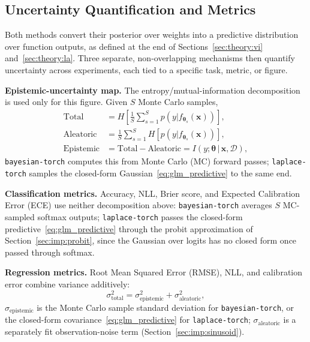 \documentclass[conference]{IEEEtran}
\newcommand{\btheta}{\bm{\theta}}
\newcommand{\cD}{\mathcal{D}}
\begin{document}
\subsection{Uncertainty Quantification and Metrics}
\label{sec:theory:unc_decomp}

Both methods convert their posterior over weights into a predictive distribution over
function outputs, as defined at the end of Sections~\ref{sec:theory:vi}
and~\ref{sec:theory:la}. Three separate, non-overlapping mechanisms then quantify
uncertainty across experiments, each tied to a specific task, metric, or figure.

\textbf{Epistemic-uncertainty map.} The entropy/mutual-information
decomposition~\citep{depeweg2019modeling} is used only for this figure. Given $S$ Monte Carlo
samples,
\begin{align}
	\text{Total}     & = H\!\left[\frac{1}{S}\sum_{s=1}^{S} p(y|f_{\btheta_s}(\bm{x}))\right], \\
	\text{Aleatoric} & = \frac{1}{S}\sum_{s=1}^{S} H\!\left[p(y|f_{\btheta_s}(\bm{x}))\right], \\
	\text{Epistemic} & = \text{Total} - \text{Aleatoric}
	= I\!\left(y;\btheta\,|\,\bm{x},\cD\right),
	\label{eq:mi}
\end{align}
\texttt{bayesian-torch} computes this from Monte Carlo (MC) forward passes;
\texttt{laplace-torch} samples
the closed-form Gaussian~\eqref{eq:glm_predictive} to the same end.

\textbf{Classification metrics.} Accuracy, NLL, Brier score, and Expected Calibration Error
(ECE) use neither decomposition above: \texttt{bayesian-torch} averages $S$ MC-sampled
softmax outputs;
\texttt{laplace-torch} passes the closed-form predictive~\eqref{eq:glm_predictive} through
the probit approximation of Section~\ref{sec:imp:probit}, since the Gaussian over logits has
no closed form once passed through softmax.

\textbf{Regression metrics.} Root Mean Squared Error (RMSE), NLL, and calibration error
combine
variance additively:
\begin{equation}
	\sigma_{\text{total}}^2 = \sigma_{\text{epistemic}}^2 + \sigma_{\text{aleatoric}}^2,
	\label{eq:additive_variance}
\end{equation}
$\sigma_{\text{epistemic}}$ is the Monte Carlo sample standard deviation for
\texttt{bayesian-torch}, or the closed-form covariance~\eqref{eq:glm_predictive} for
\texttt{laplace-torch}; $\sigma_{\text{aleatoric}}$ is a separately fit observation-noise
term (Section~\ref{sec:imp:sinusoid}).
\end{document}
